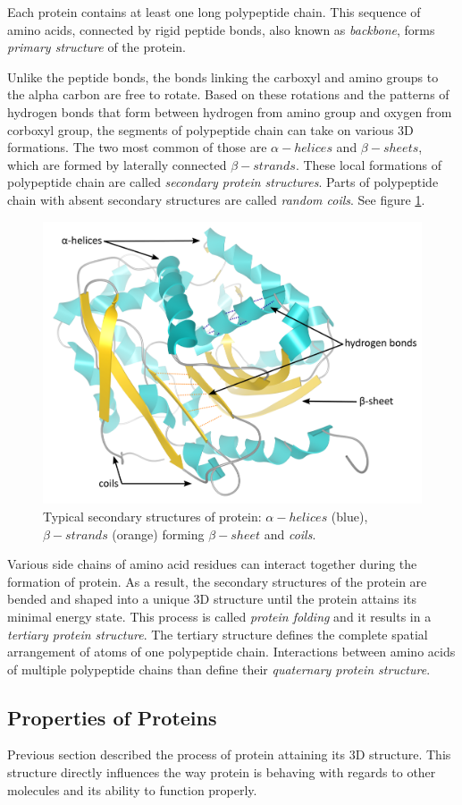 Each protein contains at least one long polypeptide chain. This sequence of amino acids, connected by rigid peptide bonds, also known as \textit{backbone}, forms \textit{primary structure} of the protein.

Unlike the peptide bonds, the bonds linking the carboxyl and amino groups to the alpha carbon are free to rotate. Based on these rotations and the patterns of hydrogen bonds that form between hydrogen from amino group and oxygen from corboxyl group, the segments of polypeptide chain can take on various 3D formations. The two most common of those are $\alpha-helices$ and $\beta-sheets$, which are formed by laterally connected $\beta-strands$. These local formations of polypeptide chain are called \textit{secondary protein structures}. Parts of polypeptide chain with absent secondary structures are called \textit{random coils}. See figure \ref{Fig:secondary}.

\begin{figure}[H]
  \centering
  \includegraphics[width=.6\textwidth]{pictures/secondary.pdf} 
  \caption{Typical secondary structures of protein: $\alpha-helices$ (blue), $\beta-strands$ (orange) forming $\beta-sheet$ and \textit{coils}.}
  \label{Fig:secondary}
\end{figure} 

Various side chains of amino acid residues can interact together during the formation of protein. As a result, the secondary structures of the protein are bended and shaped into a  unique 3D structure until the protein attains its minimal energy state. This process is called \textit{protein folding} and it results in a \textit{tertiary protein structure}. The tertiary structure defines the complete spatial arrangement of atoms of one polypeptide chain. Interactions between amino acids of multiple polypeptide chains than define their \textit{quaternary protein structure}.

\subsection{Properties of Proteins}
Previous section described the process of protein attaining its 3D structure. This structure directly influences the way protein is behaving with regards to other molecules and its ability to function properly.

